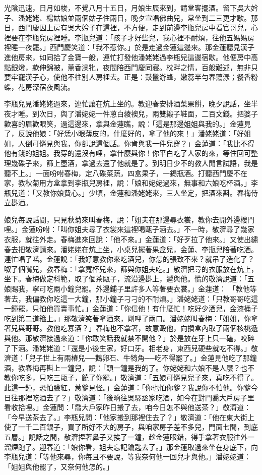 \begin{showcontents}{}
光陰迅速，日月如梭，不覺八月十五日，月娘生辰來到，請堂客擺酒。留下吳大妗子、潘姥姥、楊姑娘並兩個姑子住兩日，晚夕宣唱佛曲兒，常坐到二三更才歇。那日，西門慶因上房有吳大妗子在這裡，不方便，走到前邊李瓶兒房中看官哥兒，心裡要在李瓶兒房裡睡。李瓶兒道：「孩子才好些兒，我心裡不耐煩，往他五媽媽房裡睡一夜罷。」西門慶笑道：「我不惹你。」於是走過金蓮這邊來。那金蓮聽見漢子進他房來，如同拾了金寶一般，連忙打發他潘姥姥過李瓶兒這邊宿歇。他便房中高點銀燈，款伸錦被，薰香澡牝，夜間陪西門慶同寢。枕畔之情，百般難述，無非只要牢寵漢子心，使他不往別人房裡去。正是：鼓鬣游蜂，嫩蕊半勻春蕩漾；餐香粉蝶，花房深宿夜風流。

李瓶兒見潘姥姥過來，連忙讓在炕上坐的。教迎春安排酒菜果餅，晚夕說話，坐半夜才睡。到次日，與了潘姥姥一件蔥白綾襖兒，兩雙緞子鞋面，二百文錢。把婆子歡喜的眉歡眼笑，過這邊來，拿與金蓮瞧，說：「這是那邊姐姐與我的。」金蓮見了，反說他娘：「好恁小眼薄皮的，什麼好的，拿了他的來！」潘姥姥道：「好姐姐，人倒可憐見與我，你卻說這個話。你肯與我一件兒穿？」金蓮道：「我比不得他有錢的姐姐。我穿的還沒有哩，拿什麼與你！你平白吃了人家的來，等住回可整理幾碟子來，篩上壺酒，拿過去還了他就是了。到明日少不的教人閒言試語，我是聽不上。」一面吩咐春梅，定八碟菜蔬，四盒果子，一錫瓶酒。打聽西門慶不在家，教秋菊用方盒拿到李瓶兒房裡，說：「娘和姥姥過來，無事和六娘吃杯酒。」李瓶兒道：「又教你娘費心。」少頃，金蓮和潘姥姥來，三人坐定，把酒來斟。春梅侍立斟酒。

娘兒每說話間，只見秋菊來叫春梅，說：「姐夫在那邊尋衣裳，教你去開外邊樓門哩。」金蓮吩咐：「叫你姐夫尋了衣裳來這裡喝甌子酒去。」不一時，敬濟尋了幾家衣服，就往外走。春梅進來回說：「他不來。」金蓮道：「好歹拉了他來。」又使出繡春去把敬濟請來。潘姥姥在炕上坐，小桌兒擺著果盒兒，金蓮、李瓶兒陪著吃酒。連忙唱了喏。金蓮說：「我好意教你來吃酒兒，你怎的張致不來？就吊了造化了？呶了個嘴兒，教春梅：「拿寬杯兒來，篩與你姐夫吃。」敬濟把尋的衣服放在炕上，坐下。春梅做定科範，取了個茶甌子，流沿邊斟上，遞與他。慌的敬濟說道：「五娘賜我，寧可吃兩小鐘兒罷。外邊鋪子里許多人等著要衣裳。」金蓮道： 「教他等著去，我偏教你吃這一大鐘，那小鐘子刁刁的不耐煩。」潘姥姥道：「只教哥哥吃這一鐘罷，只怕他買賣事忙。」金蓮道：「你信他！有什麼忙！吃好少酒兒，金漆桶子吃到第二道箍上。」那敬濟笑著拿酒來，剛呷了兩口。潘姥姥叫春梅：「姐姐，你拿箸兒與哥哥。教他吃寡酒？」春梅也不拿箸，故意毆他，向攢盒內取了兩個核桃遞與他。那敬濟接過來道：「你敢笑話我就禁不開他？」於是放在牙上只一磕，咬碎了下酒。潘姥姥道：「還是小後生家，好口牙。相老身，東西兒硬些就吃不得。」敬濟道：「兒子世上有兩椿兒──鵝卵石、牛犄角──吃不得罷了。」金蓮見他吃了那鐘酒，教春梅再斟上一鐘兒，說：「頭一鐘是我的了。你姥姥和六娘不是人麼？也不教你吃多，只吃三甌子，饒了你罷。」敬濟道：「五娘可憐見兒子來，真吃不得了。此這一鐘，恐怕臉紅，惹爹見怪。」金蓮道：「你也怕你爹？我說你不怕他。你爹今日往那裡吃酒去了？」敬濟道：「後晌往吳驛丞家吃酒，如今在對門喬大戶房子里看收拾哩。」金蓮問：「喬大戶家昨日搬了去，咱今日怎不與他送茶？」敬濟道：「今早送茶去了。」李瓶兒問：「他家搬到那裡住去了？」敬濟道：「他在東大街上使了一千二百銀子，買了所好不大的房子，與咱家房子差不多兒，門面七間，到底五層。」說話之間，敬濟捏著鼻子又挨了一鐘，趁金蓮眼錯，得手拿著衣服往外一溜煙跑了。迎春道：「娘你看，姐夫忘記鑰匙去了。」那金蓮取過來坐在身底下，向李瓶兒道：「等他來尋，你每且不要說，等我奈何他一回兒才與他。」潘姥姥道：「姐姐與他罷了，又奈何他怎的。」


\end{showcontents}
